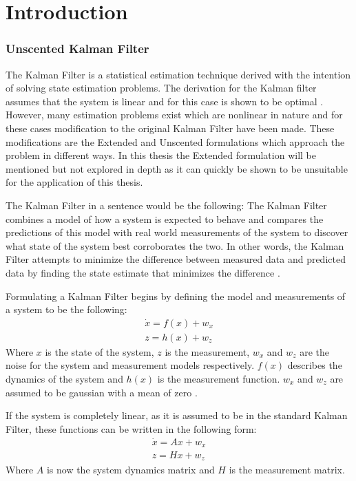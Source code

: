 \chapter*{Introduction}

\subsection{Unscented Kalman Filter}
The Kalman Filter is a statistical estimation technique derived with the intention of solving state estimation problems. \cite{ukf_merwe} The derivation for the Kalman filter assumes that the system is linear and for this case is shown to be optimal \cite{kf_kalman}. However, many estimation problems exist which are nonlinear in nature and for these cases modification to the original Kalman Filter have been made. These modifications are the Extended and Unscented formulations which approach the problem in different ways. In this thesis the Extended formulation will be mentioned but not explored in depth as it can quickly be shown to be unsuitable for the application of this thesis.

The Kalman Filter in a sentence would be the following: The Kalman Filter combines a model of how a system is expected to behave and compares the predictions of this model with real world measurements of the system to discover what state of the system best corroborates the two. In other words, the Kalman Filter attempts to minimize the difference between measured data and predicted data by finding the state estimate that minimizes the difference \cite{kf_derivation}.

Formulating a Kalman Filter begins by defining the model and measurements of a system to be the following:
\begin{align}
\dot{x} = f(x) + w_x \\
z = h(x) + w_z
\end{align}
Where $x$ is the state of the system, $z$ is the measurement, $w_x$ and $w_z$ are the noise for the system and measurement models respectively. $f(x)$ describes the dynamics of the system and $h(x)$ is the measurement function. $w_x$ and $w_z$ are assumed to be gaussian with a mean of zero \cite{kf_derivation}. 

If the system is completely linear, as it is assumed to be in the standard Kalman Filter, these functions can be written in the following form:
\begin{align}
\dot{x} = Ax + w_x \\
z = Hx + w_z
\end{align}
Where $A$ is now the system dynamics matrix and $H$ is the measurement matrix.


